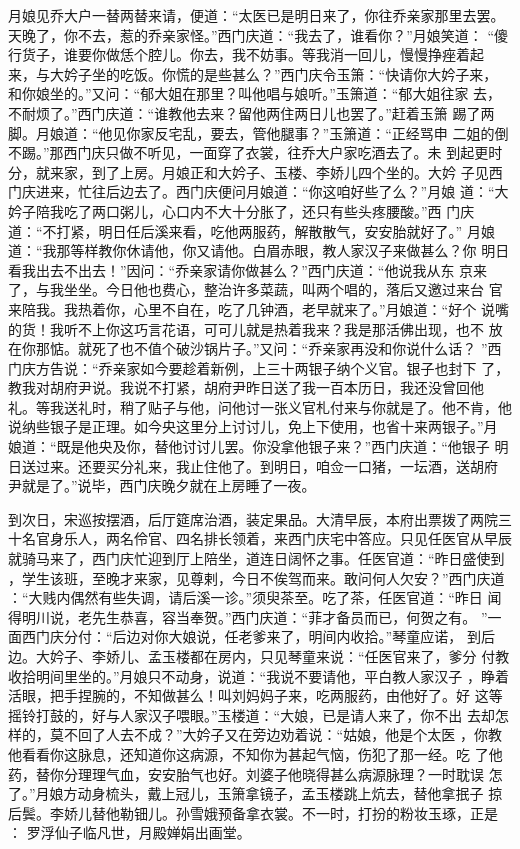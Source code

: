 月娘见乔大户一替两替来请，便道：“太医已是明日来了，你往乔亲家那里去罢。
天晚了，你不去，惹的乔亲家怪。”西门庆道：“我去了，谁看你？”月娘笑道：
“傻行货子，谁要你做恁个腔儿。你去，我不妨事。等我消一回儿，慢慢挣痤着起
来，与大妗子坐的吃饭。你慌的是些甚么？”西门庆令玉箫：“快请你大妗子来，
和你娘坐的。”又问：“郁大姐在那里？叫他唱与娘听。”玉箫道：“郁大姐往家
去，不耐烦了。”西门庆道：“谁教他去来？留他两住两日儿也罢了。”赶着玉箫
踢了两脚。月娘道：“他见你家反宅乱，要去，管他腿事？”玉箫道：“正经骂申
二姐的倒不踢。”那西门庆只做不听见，一面穿了衣裳，往乔大户家吃酒去了。未
到起更时分，就来家，到了上房。月娘正和大妗子、玉楼、李娇儿四个坐的。大妗
子见西门庆进来，忙往后边去了。西门庆便问月娘道：“你这咱好些了么？”月娘
道：“大妗子陪我吃了两口粥儿，心口内不大十分胀了，还只有些头疼腰酸。”西
门庆道：“不打紧，明日任后溪来看，吃他两服药，解散散气，安安胎就好了。”
月娘道：“我那等样教你休请他，你又请他。白眉赤眼，教人家汉子来做甚么？你
明日看我出去不出去！”因问：“乔亲家请你做甚么？”西门庆道：“他说我从东
京来了，与我坐坐。今日他也费心，整治许多菜蔬，叫两个唱的，落后又邀过来台
官来陪我。我热着你，心里不自在，吃了几钟酒，老早就来了。”月娘道：“好个
说嘴的货！我听不上你这巧言花语，可可儿就是热着我来？我是那活佛出现，也不
放在你那惦。就死了也不值个破沙锅片子。”又问：“乔亲家再没和你说什么话？
”西门庆方告说：“乔亲家如今要趁着新例，上三十两银子纳个义官。银子也封下
了，教我对胡府尹说。我说不打紧，胡府尹昨日送了我一百本历日，我还没曾回他
礼。等我送礼时，稍了贴子与他，问他讨一张义官札付来与你就是了。他不肯，他
说纳些银子是正理。如今央这里分上讨讨儿，免上下使用，也省十来两银子。”月
娘道：“既是他央及你，替他讨讨儿罢。你没拿他银子来？”西门庆道：“他银子
明日送过来。还要买分礼来，我止住他了。到明日，咱佥一口猪，一坛酒，送胡府
尹就是了。”说毕，西门庆晚夕就在上房睡了一夜。

到次日，宋巡按摆酒，后厅筵席治酒，装定果品。大清早辰，本府出票拨了两院三
十名官身乐人，两名伶官、四名排长领着，来西门庆宅中答应。只见任医官从早辰
就骑马来了，西门庆忙迎到厅上陪坐，道连日阔怀之事。任医官道：“昨日盛使到
，学生该班，至晚才来家，见尊剌，今日不俟驾而来。敢问何人欠安？”西门庆道
：“大贱内偶然有些失调，请后溪一诊。”须臾茶至。吃了茶，任医官道：“昨日
闻得明川说，老先生恭喜，容当奉贺。”西门庆道：“菲才备员而已，何贺之有。
”一面西门庆分付：“后边对你大娘说，任老爹来了，明间内收拾。”琴童应诺，
到后边。大妗子、李娇儿、孟玉楼都在房内，只见琴童来说：“任医官来了，爹分
付教收拾明间里坐的。”月娘只不动身，说道：“我说不要请他，平白教人家汉子
，睁着活眼，把手捏腕的，不知做甚么！叫刘妈妈子来，吃两服药，由他好了。好
这等摇铃打鼓的，好与人家汉子喂眼。”玉楼道：“大娘，已是请人来了，你不出
去却怎样的，莫不回了人去不成？”大妗子又在旁边劝着说：“姑娘，他是个太医
，你教他看看你这脉息，还知道你这病源，不知你为甚起气恼，伤犯了那一经。吃
了他药，替你分理理气血，安安胎气也好。刘婆子他晓得甚么病源脉理？一时耽误
怎了。”月娘方动身梳头，戴上冠儿，玉箫拿镜子，孟玉楼跳上炕去，替他拿抿子
掠后鬓。李娇儿替他勒钿儿。孙雪娥预备拿衣裳。不一时，打扮的粉妆玉琢，正是
：
罗浮仙子临凡世，月殿婵娟出画堂。